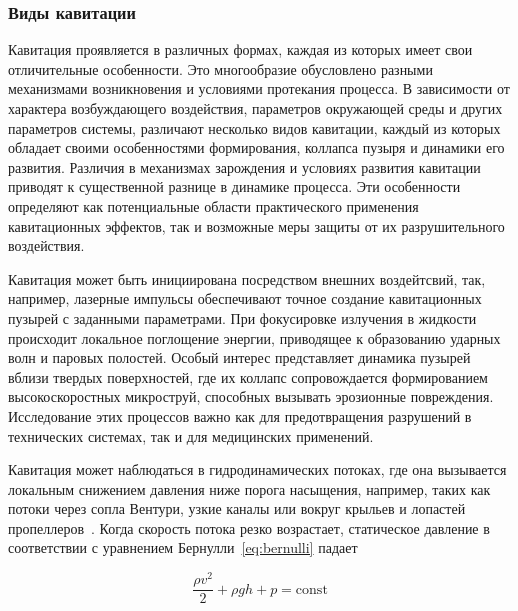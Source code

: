 \vspace{0.5\baselineskip}
\subsubsection{Виды кавитации}
\vspace{0.5\baselineskip}

Кавитация проявляется в различных формах, каждая из которых имеет свои отличительные особенности. 
Это многообразие обусловлено разными механизмами возникновения и условиями протекания процесса.
В зависимости от характера возбуждающего воздействия, параметров окружающей среды и других параметров системы, различают несколько видов кавитации, каждый из которых обладает своими особенностями формирования, коллапса пузыря и динамики его развития.
Различия в механизмах зарождения и условиях развития кавитации приводят к существенной разнице в динамике процесса.
Эти особенности определяют как потенциальные области практического применения кавитационных эффектов, так и возможные меры защиты от их разрушительного воздействия.

Кавитация может быть инициирована посредством внешних воздейтсвий, так, например, лазерные импульсы обеспечивают точное создание кавитационных пузырей с заданными параметрами. 
При фокусировке излучения в жидкости происходит локальное поглощение энергии, приводящее к образованию ударных волн и паровых полостей. 
Особый интерес представляет динамика пузырей вблизи твердых поверхностей, где их коллапс сопровождается формированием высокоскоростных микроструй, способных вызывать эрозионные повреждения. 
Исследование этих процессов важно как для предотвращения разрушений в технических системах, так и для медицинских применений.

Кавитация может наблюдаться в гидродинамических потоках, где она вызывается локальным снижением давления ниже порога насыщения, например, таких как потоки через сопла Вентури, узкие каналы или вокруг крыльев и лопастей пропеллеров~\cite{10.1007/1-4020-2233-6}.
Когда скорость потока резко возрастает, статическое давление в соответствии с уравнением Бернулли~\ref{eq:bernulli} падает

\vspace{1em}
\begin{equation}
    \displaystyle {\frac {\rho v^{2}}{2}}+\rho gh+p={\text{const}}
    \label{eq:bernulli}
\end{equation}
\vspace{1em}

